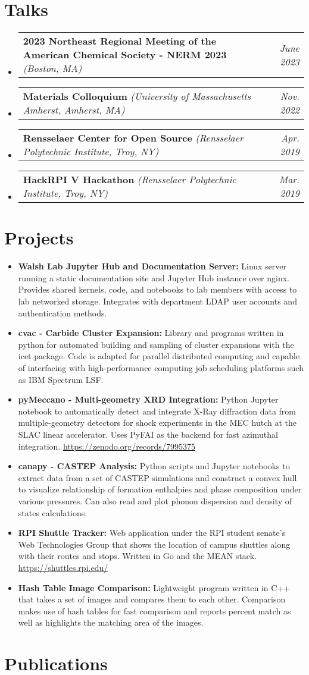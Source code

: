 \documentclass[letterpaper,11pt]{article}
\makeatletter
\newcommand{\presentation}[3]{
    \vspace{-2pt}
    \scriptsize
    \item[]
    \begin{tabularx}{\textwidth}{l@{\extracolsep{\fill}}r}
        \textbf{#1} \textit{(#2)} & \textit{#3} \\
    \end{tabularx}\vspace{-12pt}
}
\newcommand{\project}[2]{
    \vspace{-4pt} 
    \item 
    \small 
    \textbf{#1:}
    {#2 
        \vspace{-2pt}
    }
}
\makeatother
\begin{document}
\vspace{2pt}
\section{Talks}
    \vspace{4pt}
    \begin{itemize}[leftmargin=0pt]
        \presentation{2023 Northeast Regional Meeting of the American Chemical Society - NERM 2023}{Boston, MA}{June 2023}
        \presentation{Materials Colloquium}{University of Massachusetts Amherst, Amherst, MA}{Nov. 2022}
        \presentation{Rensselaer Center for Open Source}{Rensselaer Polytechnic Institute, Troy, NY}{Apr. 2019}
        \presentation{HackRPI V Hackathon}{Rensselaer Polytechnic Institute, Troy, NY}{Mar. 2019}
    \end{itemize}

\vspace{2pt}
\section{Projects}
    \vspace{4pt}
    \begin{itemize}[leftmargin=*]
        \project{Walsh Lab Jupyter Hub and Documentation Server}
            {Linux server running a static documentation site and Jupyter Hub instance over nginx. Provides shared kernels, code, and notebooks to lab members with access to lab networked storage. Integrates with department LDAP user accounts and authentication methods.}
        \project{cvac - Carbide Cluster Expansion}
            {Library and programs written in python for automated building and sampling of cluster expansions with the icet package. Code is adapted for parallel distributed computing and capable of interfacing with high-performance computing job scheduling platforms such as IBM Spectrum LSF.}
        \project{pyMeccano - Multi-geometry XRD Integration}
            {Python Jupyter notebook to automatically detect and integrate X-Ray diffraction data from multiple-geometry detectors for shock experiments in the MEC hutch at the SLAC linear accelerator. Uses PyFAI as the backend for fast azimuthal integration. \url{https://zenodo.org/records/7995375}}
        \project{canapy - CASTEP Analysis}
            {Python scripts and Jupyter notebooks to extract data from a set of CASTEP simulations and construct a convex hull to visualize relationship of formation enthalpies and phase composition under various pressures. Can also read and plot phonon dispersion and density of states calculations.}
        \project{RPI Shuttle Tracker}
            {Web application under the RPI student senate’s Web Technologies Group that shows the location of campus shuttles along with their routes and stops. Written in Go and the MEAN stack. \url{https://shuttles.rpi.edu/}}
        \project{Hash Table Image Comparison}
            {Lightweight program written in C++ that takes a set of images and compares them to each other. Comparison makes use of hash tables for fast comparison and reports percent match as well as highlights the matching area of the images.}
    \end{itemize}


\section{Publications}
\nocite{*}
\printbibliography[heading=none]
\end{document}
